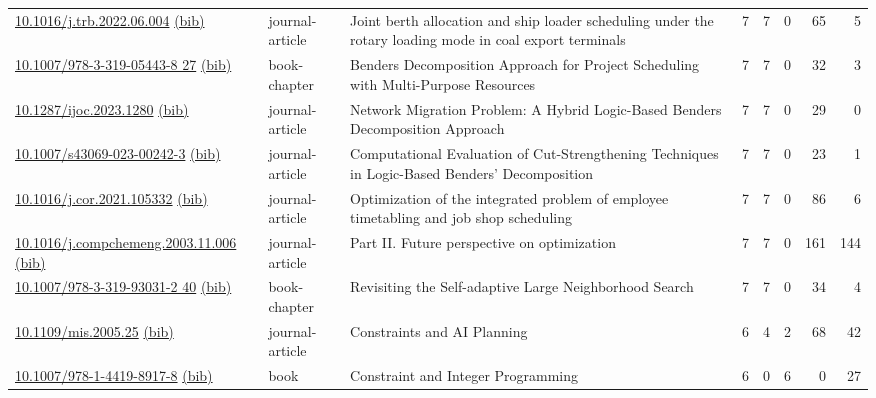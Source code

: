 {\begin{longtable}{p{5cm}lp{11cm}rrrrr}
\href{http://dx.doi.org/10.1016/j.trb.2022.06.004}{10.1016/j.trb.2022.06.004} \href{https://www.doi2bib.org/bib/10.1016/j.trb.2022.06.004}{(bib)} & journal-article & Joint berth allocation and ship loader scheduling under the rotary loading mode in coal export terminals & 7 & 7 & 0 & 65 & 5 \\
\href{http://dx.doi.org/10.1007/978-3-319-05443-8_27}{10.1007/978-3-319-05443-8 27} \href{https://www.doi2bib.org/bib/10.1007/978-3-319-05443-8_27}{(bib)} & book-chapter & Benders Decomposition Approach for Project Scheduling with Multi-Purpose Resources & 7 & 7 & 0 & 32 & 3 \\
\href{http://dx.doi.org/10.1287/ijoc.2023.1280}{10.1287/ijoc.2023.1280} \href{https://www.doi2bib.org/bib/10.1287/ijoc.2023.1280}{(bib)} & journal-article & Network Migration Problem: A Hybrid Logic-Based Benders Decomposition Approach & 7 & 7 & 0 & 29 & 0 \\
\href{http://dx.doi.org/10.1007/s43069-023-00242-3}{10.1007/s43069-023-00242-3} \href{https://www.doi2bib.org/bib/10.1007/s43069-023-00242-3}{(bib)} & journal-article & Computational Evaluation of Cut-Strengthening Techniques in Logic-Based Benders' Decomposition & 7 & 7 & 0 & 23 & 1 \\
\href{http://dx.doi.org/10.1016/j.cor.2021.105332}{10.1016/j.cor.2021.105332} \href{https://www.doi2bib.org/bib/10.1016/j.cor.2021.105332}{(bib)} & journal-article & Optimization of the integrated problem of employee timetabling and job shop scheduling & 7 & 7 & 0 & 86 & 6 \\
\href{http://dx.doi.org/10.1016/j.compchemeng.2003.11.006}{10.1016/j.compchemeng.2003.11.006} \href{https://www.doi2bib.org/bib/10.1016/j.compchemeng.2003.11.006}{(bib)} & journal-article & Part II. Future perspective on optimization & 7 & 7 & 0 & 161 & 144 \\
\href{http://dx.doi.org/10.1007/978-3-319-93031-2_40}{10.1007/978-3-319-93031-2 40} \href{https://www.doi2bib.org/bib/10.1007/978-3-319-93031-2_40}{(bib)} & book-chapter & Revisiting the Self-adaptive Large Neighborhood Search & 7 & 7 & 0 & 34 & 4 \\
\href{http://dx.doi.org/10.1109/mis.2005.25}{10.1109/mis.2005.25} \href{https://www.doi2bib.org/bib/10.1109/mis.2005.25}{(bib)} & journal-article & Constraints and AI Planning & 6 & 4 & 2 & 68 & 42 \\
\href{http://dx.doi.org/10.1007/978-1-4419-8917-8}{10.1007/978-1-4419-8917-8} \href{https://www.doi2bib.org/bib/10.1007/978-1-4419-8917-8}{(bib)} & book & Constraint and Integer Programming & 6 & 0 & 6 & 0 & 27 \\

\end{longtable}}
